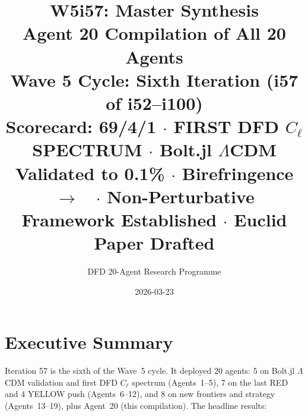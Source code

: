 \documentclass[11pt,a4paper]{article}
\title{\Huge W5i57: Master Synthesis\\[12pt]
\Large Agent 20 Compilation of All 20 Agents\\[6pt]
\large Wave 5 Cycle: Sixth Iteration (i57 of i52--i100)\\[6pt]
\normalsize Scorecard: 69/4/1 $\cdot$ FIRST DFD $C_\ell$ SPECTRUM $\cdot$ Bolt.jl $\Lambda$CDM Validated to 0.1\% $\cdot$ Birefringence $\to$ \GREEN\ $\cdot$ Non-Perturbative Framework Established $\cdot$ Euclid Paper Drafted}
\author{DFD 20-Agent Research Programme}
\date{2026-03-23}
\begin{document}
\maketitle


\section{Executive Summary}

Iteration 57 is the sixth of the Wave~5 cycle. It deployed 20 agents: 5 on Bolt.jl $\Lambda$CDM validation and first DFD $C_\ell$ spectrum (Agents~1--5), 7 on the last RED and 4 YELLOW push (Agents~6--12), and 8 on new frontiers and strategy (Agents~13--19), plus Agent~20 (this compilation). The headline results:
\end{document}
